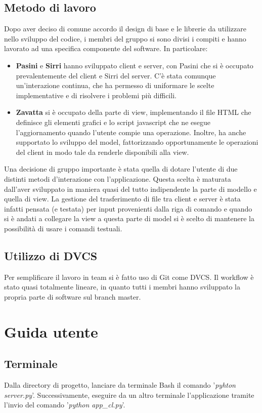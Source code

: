 \documentclass[a4paper,12pt]{report}
\begin{document}
\section{Metodo di lavoro}
Dopo aver deciso di comune accordo il design di base e le librerie da utilizzare nello sviluppo del codice, i membri del gruppo si sono divisi i compiti e hanno lavorato ad una specifica componente del software. In particolare:
\begin{itemize}
    \item \textbf{Pasini} e \textbf{Sirri} hanno sviluppato client e server, con Pasini che si è occupato prevalentemente del client e Sirri del server. C'è stata comunque un'interazione continua, che ha permesso di uniformare le scelte implementative e di risolvere i problemi più difficili.  
    \item \textbf{Zavatta} si è occupato della parte di view, implementando il file HTML che definisce gli elementi grafici e lo script javascript che ne esegue l'aggiornamento quando l'utente compie una operazione. Inoltre, ha anche supportato lo sviluppo del model, fattorizzando opportunamente le operazioni del client in modo tale da renderle disponibili alla view.
\end{itemize}

Una decisione di gruppo importante è stata quella di dotare l'utente di due distinti metodi d'interazione con l'applicazione. Questa scelta è maturata dall'aver sviluppato in maniera quasi del tutto indipendente la parte di modello e quella di view.
La gestione del trasferimento di file tra client e server è stata infatti pensata (e testata) per input provenienti dalla riga di comando e quando si è andati a collegare la view a questa parte di model si è scelto di mantenere la possibilità di usare i comandi testuali.

\section{Utilizzo di DVCS}
Per semplificare il lavoro in team si è fatto uso di Git come DVCS. Il workflow è stato quasi totalmente lineare, in quanto tutti i membri hanno sviluppato la propria parte di software sul branch master.

\chapter{Guida utente}

\section{Terminale}
Dalla directory di progetto, lanciare da terminale Bash il comando '\textit{pyhton server.py}'. Successivamente, eseguire da un altro terminale l'applicazione tramite l'invio del comando '\textit{python app\_cl.py}'.
\end{document}

